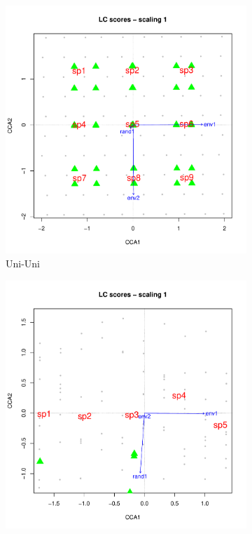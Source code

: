 		\begin{figure}[h]
			\begin{subfigure}{0.5\textwidth}		
				\centering
				\includegraphics[width=.8\linewidth]{"../02_Figures/CCASM1"}
				\caption{Uni-Uni}
			\end{subfigure}
			\begin{subfigure}{0.5\textwidth}
				\centering		
				\includegraphics[width=.8\linewidth]{"../02_Figures/CCASM2"}

\end{subfigure}
\end{figure}

